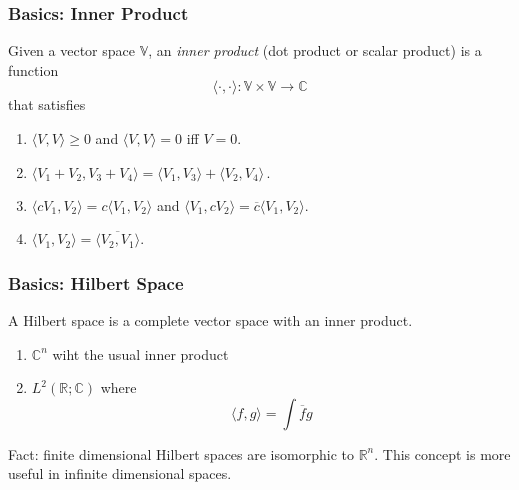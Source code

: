\documentclass[12pt]{beamer}
\begin{document}
\begin{frame}
    \frametitle{ Basics: Inner Product}
    \begin{definition}
        Given a vector space $\mathbb{V}$, an \emph{inner product } (dot product or scalar product)
        is a function
        \begin{equation*}
            \langle \cdot, \cdot \rangle : \mathbb{V}\times \mathbb{V} \to \mathbb{C}
        \end{equation*}
        that satisfies
        \begin{enumerate}
            \item $\langle V, V\rangle \geq 0$ and $\langle V, V \rangle = 0$ iff $V = 0$.
            \item $\langle V_1 + V_2, V_3 + V_4 \rangle = \langle V_1 , V_3 \rangle +
                                                \langle V_2 , V_4 \rangle \,.$
            \item $\langle c V_1, V_2\rangle = c \langle V_1, V_2 \rangle $
                and
                $ \langle V_1, c V_2 \rangle = \overline{c} \langle V_1, V_2 \rangle$.
            \item $\langle V_1, V_2 \rangle = \overline{ \langle V_2, V_1 \rangle  }$.
        \end{enumerate}
    \end{definition}
\end{frame}


\begin{frame}
    \frametitle{ Basics: Hilbert Space}
    \begin{definition}
        A Hilbert space is a complete vector space with an inner product.
    \end{definition}
    \begin{example}
        \begin{enumerate}
            \item $\mathbb{C}^n$ wiht the usual inner product
            \item $L^2(\mathbb{R};\mathbb{C})$ where
                \begin{equation*}
                    \langle f, g \rangle = \int \overline{f} g 
                \end{equation*}
        \end{enumerate}
        Fact: finite dimensional Hilbert spaces are isomorphic to $\mathbb{R}^n$.
        This concept is more useful in infinite dimensional spaces.
    \end{example}

\end{frame}
\end{document}
